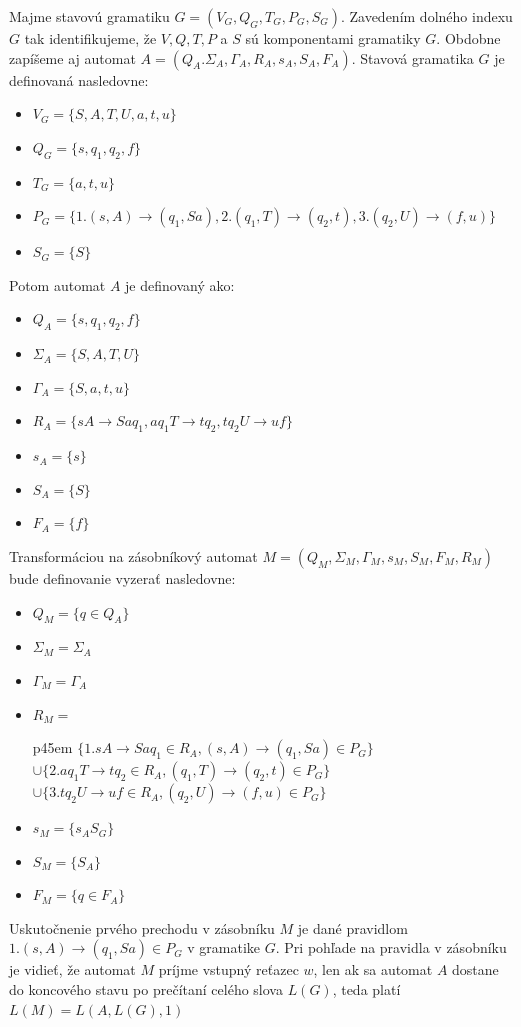 \begin{theorem}
\normalfont Majme stavovú gramatiku $G = (V_G, Q_G, T_G, P_G, S_G)$. Zavedením dolného indexu $G$ tak identifikujeme, že $V, Q, T, P$ a $ S$ sú komponentami gramatiky $G$. Obdobne zapíšeme aj automat $A = (Q_A. \Sigma_A, \Gamma_A, R_A, s_A, S_A, F_A)$. Stavová gramatika $G$ je definovaná nasledovne:
\begin{itemize}
\item $V_G = \{S, A, T, U, a, t, u\}$
\item $Q_G = \{s, q_1, q_2, f\}$
\item $T_G = \{a, t, u\}$
\item $P_G = \{1. (s, A) \to (q_1, Sa), 2. (q_1, T) \to (q_2, t), 3. (q_2, U) \to (f, u) \}$
\item $S_G = \{S\}$
\end{itemize} 
Potom automat $A$ je definovaný ako:
\begin{itemize}
\item $Q_A = \{s, q_1, q_2, f\}$
\item $\Sigma_A = \{S, A, T, U\}$
\item $\Gamma_A = \{S, a, t, u\}$
\item $R_A = \{sA \to Saq_1, aq_1T \to tq_2, tq_2U \to uf\}$
\item $s_A = \{s\}$
\item $S_A = \{S\}$
\item $F_A = \{f\}$
\end{itemize} 
Transformáciou na zásobníkový automat $M = (Q_M, \Sigma_M, \Gamma_M, s_M, S_M, F_M, R_M)$ bude definovanie vyzerať nasledovne:
\begin{itemize}
\item $Q_M = \{q \in Q_A\}$
\item $\Sigma_M = \Sigma_A$
\item $\Gamma_M = \Gamma_A$
\item \vspace{-2.5em} $R_M =$ \begin{tabular}{{ p{45em} }} 
\vspace{2em}\hspace{-0.45em}$ \{1.sA \to Saq_1 \in R_A, (s, A) \to (q_1, Sa) \in P_G\} $\\
\hspace{-0.45em}$ \cup \{ 2.aq_1T \to tq_2 \in R_A, (q_1, T) \to (q_2, t) \in P_G\} $ \\
\hspace{-0.45em}$ \cup \{ 3.tq_2U \to uf \in R_A, (q_2, U) \to (f, u) \in P_G \}$
\end{tabular}
\item $s_M = \{s_AS_G\}$
\item $S_M = \{S_A\}$
\item $F_M = \{q \in F_A\}$
\end{itemize} 
\end{theorem}
Uskutočnenie prvého prechodu v zásobníku $M$ je dané pravidlom $1.(s, A) \to (q_1, Sa) \in P_G$ v gramatike $G$. Pri pohľade na pravidla v zásobníku je vidieť, že automat $M$ príjme vstupný reťazec $w$, len ak sa automat $A$ dostane do koncového stavu po prečítaní celého slova $L(G)$, teda platí $L(M) = L(A, L(G), 1)$



